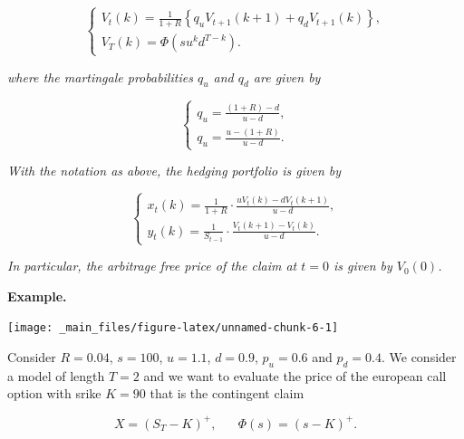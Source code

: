 \documentclass[
]{book}
\begin{document}
\[
\left\{\begin{matrix}V_t(k)=\frac{1}{1+R}\left\{q_uV_{t+1}(k+1)+q_dV_{t+1}(k)\right\},\\ V_T(k)=\Phi(su^kd^{T-k}).\end{matrix}\right.
\]

\emph{where the martingale probabilities \(q_u\) and \(q_d\) are given by}

\[
\left\{\begin{matrix}q_u=\frac{(1+R)-d}{u-d},\\ q_u=\frac{u-(1+R)}{u-d}.\end{matrix}\right.
\]

\emph{With the notation as above, the hedging portfolio is given by}

\[
\left\{\begin{matrix}x_t(k)=\frac{1}{1+R}\cdot\frac{uV_t(k)-dV_t(k+1)}{u-d},\\ y_t(k)=\frac{1}{S_{t-1}}\cdot\frac{V_t(k+1)-V_t(k)}{u-d}.\end{matrix}\right.
\]

\emph{In particular, the arbitrage free price of the claim at \(t=0\) is given by \(V_0(0)\).}

\textbf{Example.}

\begin{center}\texttt{[image: \_main\_files/figure-latex/unnamed-chunk-6-1]} \end{center}

Consider \(R=0.04\), \(s=100\), \(u=1.1\), \(d=0.9\), \(p_u=0.6\) and \(p_d=0.4\). We consider a model of length \(T=2\) and we want to evaluate the price of the european call option with srike \(K=90\) that is the contingent claim

\[
X=(S_T-K)^+,\hspace{20pt}\Phi(s)=(s-K)^+.
\]
\end{document}
